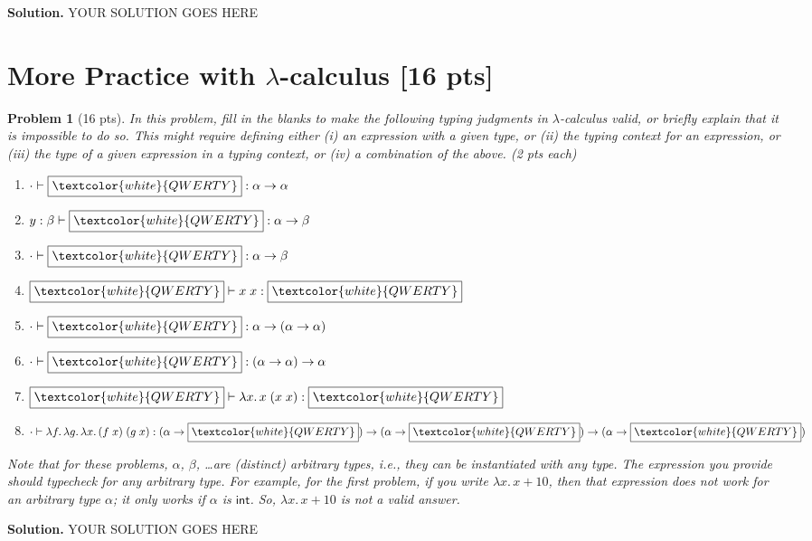\documentclass{article}
\newcommand{\lc}{$\lambda$-calculus}
\newcommand{\m}[1]{\mathsf{#1}}
\newcommand{\elam}[2]{\lambda{#1}.\,{#2}}
\newcommand{\eapp}[2]{#1 \; #2}
\newcommand{\tint}{\m{int}}
\newcommand{\emptybox}{\boxed{\textcolor{white}{QWERTY}}}
\newtheorem{problem}{Problem}
\newenvironment{solution}{\textbf{Solution.}}{}
\begin{document}
\begin{solution}
    YOUR SOLUTION GOES HERE
\end{solution}

\section{More Practice with \lc{} [16 pts]}

\begin{problem}[16 pts]
    In this problem, fill in the blanks to make the following typing judgments in \lc{} valid, or briefly explain
    that it is impossible to do so. This might require defining either (i) an expression with a given type,
    or (ii) the typing context for an expression,
    or (iii) the type of a given expression in a typing context,
    or (iv) a combination of the above. (2 pts each)

    \begin{enumerate}
        \item $\cdot \vdash \emptybox : \alpha \rightarrow \alpha$
        
        \item $y : \beta \vdash \emptybox : \alpha \rightarrow \beta$
        
        \item $\cdot \vdash \emptybox : \alpha \rightarrow \beta$
        
        \item $\emptybox \vdash \eapp{x}{x} : \emptybox$
        
        \item $\cdot \vdash \emptybox : \alpha \rightarrow (\alpha \rightarrow \alpha)$
        
        \item $\cdot \vdash \emptybox : (\alpha \rightarrow \alpha) \rightarrow \alpha$
        
        \item $\emptybox \vdash \elam{x}{\eapp{x}{(\eapp{x}{x})}} : \emptybox$
        
        \item $\cdot \vdash \elam{f}{\elam{g}{\elam{x}{\eapp{(\eapp{f}{x})}{(\eapp{g}{x})}}}} : (\alpha \rightarrow \emptybox) \rightarrow (\alpha \rightarrow \emptybox) \rightarrow (\alpha \rightarrow \emptybox)$
    \end{enumerate}

    Note that for these problems, $\alpha$, $\beta$, \ldots are (distinct) arbitrary types, i.e., they can be instantiated
    with any type. The expression you provide should typecheck for any arbitrary type.
    For example, for the first problem, if you write $\elam{x}{x+10}$, then that expression does not work for an arbitrary
    type $\alpha$; it only works if $\alpha$ is $\tint$.
    So, $\elam{x}{x+10}$ is not a valid answer.
\end{problem}

\begin{solution}
    YOUR SOLUTION GOES HERE
\end{solution}
\end{document}
